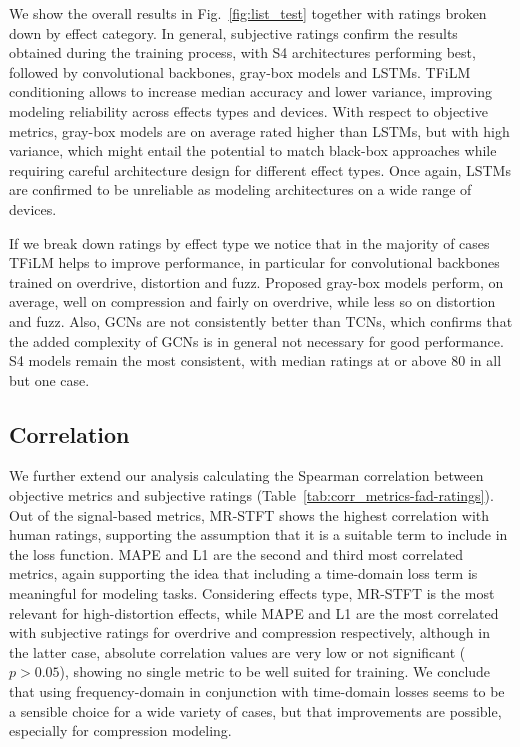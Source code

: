 We show the overall results in Fig.~\ref{fig:list_test} together with ratings broken down by effect category.
In general, subjective ratings confirm the results obtained during the training process, with S4 architectures performing best, followed by convolutional backbones, gray-box models and LSTMs.
TFiLM conditioning allows to increase median accuracy and lower variance, improving modeling reliability across effects types and devices.
With respect to objective metrics, gray-box models are on average rated higher than LSTMs, but with high variance, which might entail the potential to match black-box approaches while requiring careful architecture design for different effect types.
Once again, LSTMs are confirmed to be unreliable as modeling architectures on a wide range of devices.

If we break down ratings by effect type we notice that in the majority of cases TFiLM helps to improve performance, in particular for convolutional backbones trained on overdrive, distortion and fuzz.
Proposed gray-box models perform, on average, well on compression and fairly on overdrive, while less so on distortion and fuzz.
Also, GCNs are not consistently better than TCNs, which confirms that the added complexity of GCNs is in general not necessary for good performance.
S4 models remain the most consistent, with median ratings at or above 80 in all but one case.

\subsection{Correlation}
\label{sc:correlation}

We further extend our analysis calculating the Spearman correlation between objective metrics and subjective ratings (Table~\ref{tab:corr_metrics-fad-ratings}).
Out of the signal-based metrics, MR-STFT shows the highest correlation with human ratings, supporting the assumption that it is a suitable term to include in the loss function.
MAPE and L1 are the second and third most correlated metrics, again supporting the idea that including a time-domain loss term is meaningful for modeling tasks.
Considering effects type, MR-STFT is the most relevant for high-distortion effects, while MAPE and L1 are the most correlated with subjective ratings for overdrive and compression respectively, although in the latter case, absolute correlation values are very low or not significant ($p > 0.05$), showing no single metric to be well suited for training.
We conclude that using frequency-domain in conjunction with time-domain losses seems to be a sensible choice for a wide variety of cases, but that improvements are possible, especially for compression modeling.

